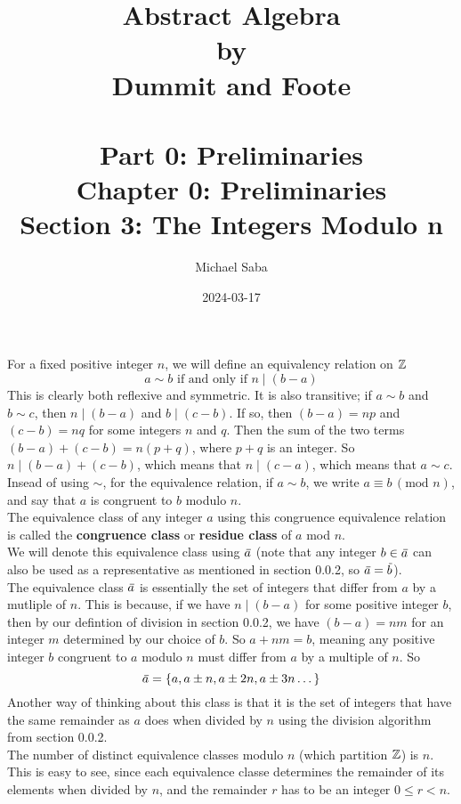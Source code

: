\documentclass[12pt]{article}
\title{%
    \Huge Abstract Algebra \\
    \large by \\
    \Large Dummit and Foote \\~\\
    \huge Part 0: Preliminaries \\
    \LARGE Chapter 0: Preliminaries \\
    \Large Section 3: The Integers Modulo n
}
\date{2024-03-17}
\author{Michael Saba}
\begin{document}
    \maketitle
    \newpage    
    \setlength{\parindent}{0pt}

    For a fixed positive integer $n$,
    we will define an equivalency relation on $\mathbb{Z}$
    \[ a \sim b \text{ if and only if } n \mid (b - a) \]
    This is clearly both reflexive and symmetric.
    It is also transitive;
    if $a \sim b$ and $b \sim c$,
    then $n \mid (b-a)$ and $b \mid (c-b)$.
    If so, then $(b-a) = np$ and $(c-b) = nq$
    for some integers $n$ and $q$.
    Then the sum of the two terms $(b-a) + (c-b) = n(p+q)$,
    where $p+q$ is an integer.
    So $n \mid (b-a) + (c-b)$,
    which means that $n \mid (c-a)$,
    which means that $a \sim c$. \\
    Insead of using $\sim$,
    for the equivalence relation,
    if $a \sim b$,
    we write $a \equiv b \, (\text{mod }n)$,
    and say that $a$ is congruent to $b$ modulo $n$. \\
    The equivalence class of any integer $a$
    using this congruence equivalence relation
    is called the \textbf{congruence class} or \textbf{residue class}
    of $a$ mod $n$. \\
    We will denote this equivalence class using $\,\overline{\!{a}}$
    (note that any integer $b \in \,\overline{\!{a}}$ can also be used
    as a representative as mentioned in section 0.0.2,
    so $\,\overline{\!{a}} = \,\overline{\!{b}}$). \\

    The equivalence class $\,\overline{\!{a}}$ is essentially the set 
    of integers that differ from $a$ by a mutliple of $n$.
    This is because, if we have $n \mid (b - a)$
    for some positive integer $b$,
    then by our defintion of division in section 0.0.2,
    we have $(b-a) = nm$ for an integer $m$
    determined by our choice of $b$.
    So $a + nm = b$,
    meaning any positive integer $b$ congruent to $a$ modulo $n$
    must differ from $a$ by a multiple of $n$.
    So
    \[ \,\overline{\!{a}} = \{ a, a \pm n, a \pm 2n, a \pm 3n \dots \} \]
    Another way of thinking about this class is that it is the set
    of integers that have the same remainder as $a$ does
    when divided by $n$ using the division algorithm from section 0.0.2. \\

    The number of distinct equivalence classes modulo $n$
    (which partition $\mathbb{Z}$) is $n$.
    This is easy to see, since each equivalence classe
    determines the remainder of its elements when divided by $n$,
    and the remainder $r$ has to be an integer $0 \leqslant r < n$. \\
    
\end{document}
